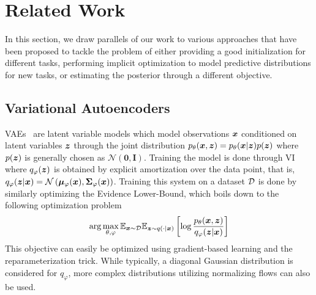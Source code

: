 \section{Related Work}
\label{appdx:related_work}
In this section, we draw parallels of our work to various approaches that have been proposed to tackle the problem of either providing a good initialization for different tasks, performing implicit optimization to model predictive distributions for new tasks, or estimating the posterior through a different objective.

\subsection{Variational Autoencoders}
VAEs~\citep{kingma2013auto,rezende2014stochastic,rezende2015variational,kingma2019introduction} are latent variable models which model observations ${\bm{x}}$ conditioned on latent variables ${\bm{z}}$ through the joint distribution $p_\theta({\bm{x}}, {\bm{z}}) = p_\theta({\bm{x}} | {\bm{z}}) p({\bm{z}})$ where $p({\bm{z}})$ is generally chosen as $\mathcal{N}(\mathbf{0}, \mathbf{I})$. Training the model is done through VI where $q_\varphi({\bm{z}})$ is obtained by explicit amortization over the data point, that is, $q_\varphi({\bm{z}} | {\bm{x}}) = {\mathcal{N}}\left({\bm{\mu}}_\varphi({\bm{x}}), {\bm{\Sigma}}_\varphi({\bm{x}})\right)$. Training this system on a dataset ${\mathcal{D}}$ is done by similarly optimizing the Evidence Lower-Bound, which boils down to the following optimization problem
\begin{align}
    \arg\max_{\theta, \varphi} {\mathbb{E}}_{{\bm{x}} \sim {\mathcal{D}}}{\mathbb{E}}_{{\bm{z}} \sim q(\cdot | {\bm{x}})}\left[\log \frac{p_\theta({\bm{x}}, {\bm{z}})}{q_\varphi({\bm{z}} | {\bm{x}})}\right]
\end{align}
This objective can easily be optimized using gradient-based learning and the reparameterization trick. While typically, a diagonal Gaussian distribution is considered for $q_\varphi$, more complex distributions utilizing normalizing flows can also be used.


